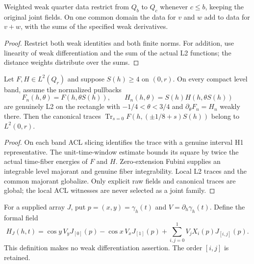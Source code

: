 \begin{lemma}
\label{lem:weighted-quarter-data-algebra}
\leanok
Weighted weak quarter data restrict from $Q_b$ to $Q_c$ whenever $c\le b$,
keeping the original joint fields.
On one common domain the data for $v$ and $w$ add to data for $v+w$,
with the sums of the specified weak derivatives.
\end{lemma}

\begin{proof}
\leanok
Restrict both weak identities and both finite norms.
For addition, use linearity of weak differentiation and the sum of the
actual L2 functions; the distance weights distribute over the sums.
\end{proof}

\begin{lemma}
\label{lem:quarter-clock-trace}
\leanok
Let $F,H\in L^2(Q_r)$ and suppose $S(h)\ge4$ on $(0,r)$.
On every compact level band, assume the normalized pullbacks
\[
 F_n(h,\theta)=F(h,\theta S(h)),\qquad
 H_n(h,\theta)=S(h)H(h,\theta S(h))
\]
are genuinely L2 on the rectangle with $-1/4<\theta<3/4$ and
$\partial_\theta F_n=H_n$ weakly there.
Then the canonical traces
$\operatorname{Tr}_{s=0}F(h,(\pm1/8+s)S(h))$ belong to $L^2(0,r)$.
\end{lemma}

\begin{proof}
\leanok
On each band ACL slicing identifies the trace with a genuine interval H1
representative. The unit-time-window estimate bounds its square by twice
the actual time-fiber energies of $F$ and $H$.
Zero-extension Fubini supplies an integrable level majorant and genuine
fiber integrability. Local L2 traces and the common majorant globalize.
Only explicit raw fields and canonical traces are global; the local ACL
witnesses are never selected as a joint family.
\end{proof}

\begin{definition}
\label{def:first-bulk-time-derivative}
\leanok
For a supplied array $J$, put $p=(x,y)=\gamma_h(t)$ and $V=\partial_h\gamma_h(t)$.
Define the formal field
\[
 H_J(h,t)=\cos y\,V_y J_{[0]}(p)-\cos x\,V_x J_{[1]}(p)
       +\sum_{i,j=0}^1 V_j X_i(p)J_{[i,j]}(p).
\]
This definition makes no weak differentiation assertion.
The order $[i,j]$ is retained.
\end{definition}

